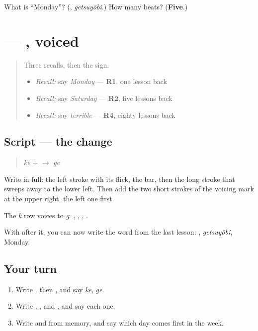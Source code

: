\begin{tcolorbox}[breakable,colback=teal!4,colframe=teal!35!black,title={Before you move on}]
What is \textquotedblleft{}Monday\textquotedblright{}? (\textbf{}, \emph{getsuyōbi}.) How many beats? (\textbf{Five}.)
\end{tcolorbox}
\section[\texorpdfstring{\ja{げ} (ge)}{げ (ge)}]{ — , voiced}

\label{lesson:JA-W135-ge}



\begin{quote}
Three recalls, then the sign.

\begin{itemize}
\raggedright
  \item \emph{Recall:} say \emph{Monday} — \textbf{R1}, one lesson back
  \item \emph{Recall:} say \emph{Saturday} — \textbf{R2}, five lessons back
  \item \emph{Recall:} say \emph{terrible} — \textbf{R4}, eighty lessons back
\end{itemize}
\end{quote}

\subsection*{Script — the change}

\begin{quote}
\textbf{} \emph{ke} + \textbf{} $\to$ \textbf{} \emph{ge}
\end{quote}

Write \textbf{} in full: the left stroke with its flick, the bar, then the long stroke that sweeps away to the lower left. Then add the two short strokes of the voicing mark at the upper right, the left one first.

The \emph{k} row voices to \emph{g}: \textbf{}, \textbf{}, \textbf{}, \textbf{}.

With \textbf{} after it, you can now write the word from the last lesson: \textbf{}, \emph{getsuyōbi}, Monday.

\subsection*{Your turn}
\begin{enumerate}
\raggedright
  \item Write \textbf{}, then \textbf{}, and say \emph{ke}, \emph{ge}.
  \item Write \textbf{}, \textbf{}, \textbf{} and \textbf{}, and say each one.
  \item Write \textbf{} and \textbf{} from memory, and say which day comes first in the week.
\end{enumerate}


